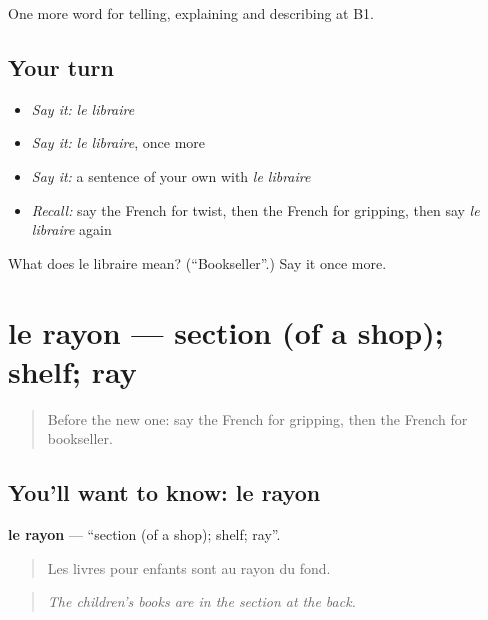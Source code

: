 \begin{grammarlens}[title={What you've built}]
One more word for telling, explaining and describing at B1.
\end{grammarlens}

\subsection*{Your turn}
\begin{itemize}
\raggedright
  \item \emph{Say it:} \emph{le libraire}
  \item \emph{Say it:} \emph{le libraire}, once more
  \item \emph{Say it:} a sentence of your own with \emph{le libraire}
  \item \emph{Recall:} say the French for twist, then the French for gripping, then say \emph{le libraire} again
\end{itemize}

\begin{tcolorbox}[breakable,colback=teal!4,colframe=teal!35!black,title={Before you move on}]
What does le libraire mean? (\textquotedblleft{}Bookseller\textquotedblright{}.) Say it once more.
\end{tcolorbox}
\section[le rayon]{le rayon — section (of a shop); shelf; ray}

\label{lesson:FR-C520-rayon}



\begin{quote}
Before the new one: say the French for gripping, then the French for bookseller.
\end{quote}

\subsection*{You'll want to know: le rayon}
\textbf{le rayon} — \textquotedblleft{}section (of a shop); shelf; ray\textquotedblright{}.

\begin{quote}
Les livres pour enfants sont au rayon du fond.
\end{quote}

\begin{quote}
\emph{The children's books are in the section at the back.}
\end{quote}

